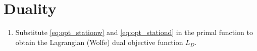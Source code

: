 \documentclass[journal,12pt,twocolumn]{IEEEtran}
\renewcommand\thesection{\arabic{section}}
\begin{document}
\section{Duality}
\begin{enumerate}[label=\thesection.\arabic*,ref=\thesection.\theenumi]

\item Substitute \eqref{eq:opt_stationw}
and \eqref{eq:opt_stationd}
in the primal function to obtain the Lagrangian 
(Wolfe) dual objective function $L_D$.  
%
%
%

\end{enumerate}
\end{document}
